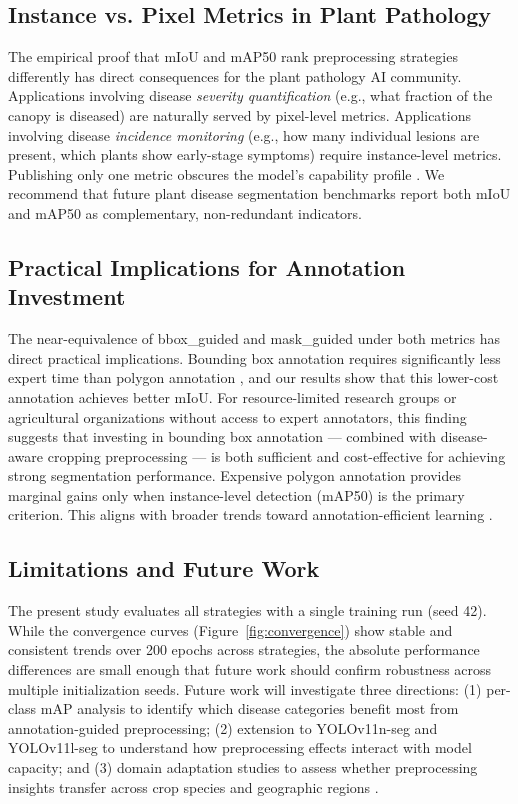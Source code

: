 \documentclass[preprint,12pt]{elsarticle}
\begin{document}
\subsection{Instance vs. Pixel Metrics in Plant Pathology}
The empirical proof that mIoU and mAP50 rank preprocessing strategies differently has direct consequences for the plant pathology AI community. Applications involving disease \emph{severity quantification} (e.g., what fraction of the canopy is diseased) are naturally served by pixel-level metrics. Applications involving disease \emph{incidence monitoring} (e.g., how many individual lesions are present, which plants show early-stage symptoms) require instance-level metrics. Publishing only one metric obscures the model's capability profile \citep{rethink2021segeval}. We recommend that future plant disease segmentation benchmarks report both mIoU and mAP50 as complementary, non-redundant indicators.

\subsection{Practical Implications for Annotation Investment}
The near-equivalence of bbox\_guided and mask\_guided under both metrics has direct practical implications. Bounding box annotation requires significantly less expert time than polygon annotation \citep{khoreva2017simple}, and our results show that this lower-cost annotation achieves better mIoU. For resource-limited research groups or agricultural organizations without access to expert annotators, this finding suggests that investing in bounding box annotation --- combined with disease-aware cropping preprocessing --- is both sufficient and cost-effective for achieving strong segmentation performance. Expensive polygon annotation provides marginal gains only when instance-level detection (mAP50) is the primary criterion. This aligns with broader trends toward annotation-efficient learning \citep{xu2023embracinglimitedand, mullins2024leveragingzeroshotdetection}.

\subsection{Limitations and Future Work}
The present study evaluates all strategies with a single training run (seed 42). While the convergence curves (Figure~\ref{fig:convergence}) show stable and consistent trends over 200 epochs across strategies, the absolute performance differences are small enough that future work should confirm robustness across multiple initialization seeds. Future work will investigate three directions: (1) per-class mAP analysis to identify which disease categories benefit most from annotation-guided preprocessing; (2) extension to YOLOv11n-seg and YOLOv11l-seg to understand how preprocessing effects interact with model capacity; and (3) domain adaptation studies to assess whether preprocessing insights transfer across crop species and geographic regions \citep{wu2023fromlaboratoryto}.
\end{document}
